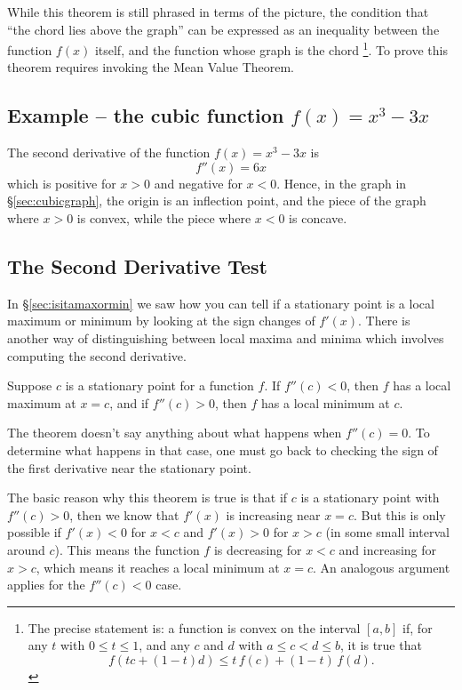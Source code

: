 While this theorem is still phrased in terms of the picture, the condition that
``the chord lies above the graph'' can be expressed as an inequality between the
function $f(x)$ itself, and the function whose graph is the chord%
\footnote{The precise statement is: a function is convex on the interval $[a,b]$
if, for any $t$ with $0\leq t\leq 1$, and any $c$ and $d$ with $a\leq c < d\leq
b$, it is true that
\[
f(tc+(1-t)d) \leq t \,f(c) + (1-t)\, f(d).
\]
}.
To prove this theorem requires invoking the Mean Value Theorem.
  






\subsection{Example -- the cubic function $f(x) = x^3-3x$} %
\label{sec:convexpartofcubic}%
The second derivative of the function $f(x) = x^3-3x$ is
\[
f''(x) = 6x
\]
which is positive for $x>0$ and negative for $x<0$. Hence, in the graph in
\S\ref{sec:cubicgraph}, the origin is an inflection point, and the piece of the
graph where $x>0$ is convex, while the piece where $x<0$ is concave.


\subsection{The Second Derivative Test} %
In \S\ref{sec:isitamaxormin} we saw how you can tell if a stationary point is a
local maximum or minimum by looking at the sign changes of $f'(x)$.  There is
another way of distinguishing between local maxima and minima which involves
computing the second derivative.
\begin{theorem}
  Suppose $c$ is a stationary point for a function $f$.  If $f''(c)<0$, then $f$
  has a local maximum at $x=c$, and if $f''(c)>0$, then $f$ has a local minimum at $c$.
\end{theorem}\smallskip

The theorem doesn't say anything about what happens when $f''(c) = 0$.  To
determine what happens in that case, one must go back to checking the sign of
the first derivative near the stationary point.




The basic reason why this theorem is true is that if $c$ is a stationary point
with $f''(c)>0$, then we know that $f'(x)$ is increasing near $x=c$. But this is
only possible if $f'(x)<0$ for $x<c$ and $f'(x)>0$ for $x>c$ (in some small
interval around $c$).  This means the function $f$ is decreasing for $x<c$ and
increasing for $x>c$, which means it reaches a local minimum at $x=c$. An
analogous argument applies for the $f''(c)<0$ case.
\marginpar{\sffamily\itshape\footnotesize%
   \\
   }

